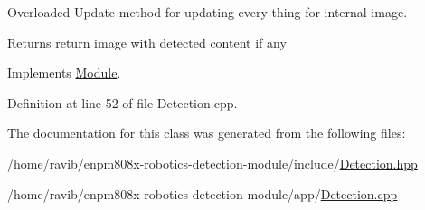 Overloaded Update method for updating every thing for internal image. 

\begin{DoxyReturn}{Returns}
return image with detected content if any 
\end{DoxyReturn}


Implements \hyperlink{class_module_a21af40d45926cf90d6573f5ac5a1149f}{Module}.



Definition at line 52 of file Detection.\+cpp.



The documentation for this class was generated from the following files\+:\begin{DoxyCompactItemize}
\item 
/home/ravib/enpm808x-\/robotics-\/detection-\/module/include/\hyperlink{_detection_8hpp}{Detection.\+hpp}\item 
/home/ravib/enpm808x-\/robotics-\/detection-\/module/app/\hyperlink{_detection_8cpp}{Detection.\+cpp}\end{DoxyCompactItemize}
